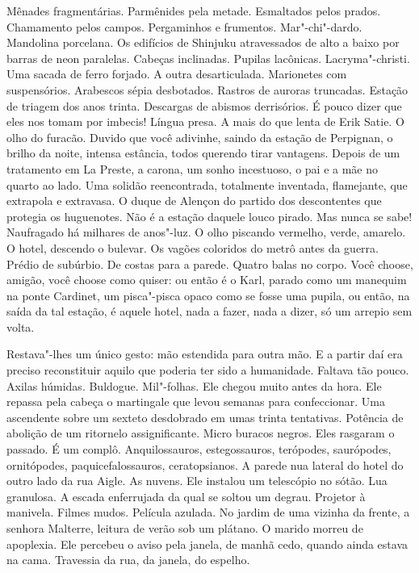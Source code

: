 Mênades fragmentárias. Parmênides pela metade. Esmaltados pelos prados.
Chamamento pelos campos. Pergaminhos e frumentos. Mar"-chi"-dardo.
Mandolina porcelana. Os edifícios de Shinjuku atravessados de alto a
baixo por barras de neon paralelas. Cabeças inclinadas. Pupilas
lacônicas. Lacryma"-christi. Uma sacada de ferro forjado. A outra
desarticulada. Marionetes com suspensórios. Arabescos sépia desbotados.
Rastros de auroras truncadas. Estação de triagem dos anos trinta.
Descargas de abismos derrisórios. É pouco dizer que eles nos tomam por
imbecis! Língua presa. A mais do que lenta de Erik Satie. O olho do
furacão. Duvido que você adivinhe, saindo da estação de Perpignan, o
brilho da noite, intensa estância, todos querendo tirar vantagens.
Depois de um tratamento em La Preste, a carona, um sonho incestuoso, o
pai e a mãe no quarto ao lado. Uma solidão reencontrada, totalmente
inventada, flamejante, que extrapola e extravasa. O duque de Alençon do
partido dos descontentes que protegia os huguenotes. Não é a estação
daquele louco pirado. Mas nunca se sabe! Naufragado há milhares de
anos"-luz. O olho piscando vermelho, verde, amarelo. O hotel, descendo o
bulevar. Os vagões coloridos do metrô antes da guerra. Prédio de
subúrbio. De costas para a parede. Quatro balas no corpo. Você choose,
amigão, você choose como quiser: ou então é o Karl, parado como um
manequim na ponte Cardinet, um pisca"-pisca opaco como se fosse uma
pupila, ou então, na saída da tal estação, é aquele hotel, nada a fazer,
nada a dizer, só um arrepio sem volta.

Restava"-lhes um único gesto: mão estendida para outra mão. E a partir
daí era preciso reconstituir aquilo que poderia ter sido a humanidade.
Faltava tão pouco. Axilas húmidas. Buldogue. Mil"-folhas. Ele chegou %
muito antes da hora. Ele repassa pela cabeça o martingale que levou
semanas para confeccionar. Uma ascendente sobre um sexteto desdobrado em
umas trinta tentativas. Potência de abolição de um ritornelo
assignificante. Micro buracos negros. Eles rasgaram o passado. É um
complô. Anquilossauros, estegossauros, terópodes, saurópodes,
ornitópodes, paquicefalossauros, ceratopsianos. A parede nua lateral do
hotel do outro lado da rua Aigle. As nuvens. Ele instalou um telescópio
no sótão. Lua granulosa. A escada enferrujada da qual se soltou um
degrau. Projetor à manivela. Filmes mudos. Película azulada. No jardim
de uma vizinha da frente, a senhora Malterre, leitura de verão sob um
plátano. O marido morreu de apoplexia. Ele percebeu o aviso pela janela,
de manhã cedo, quando ainda estava na cama. Travessia da rua, da janela,
do espelho.

